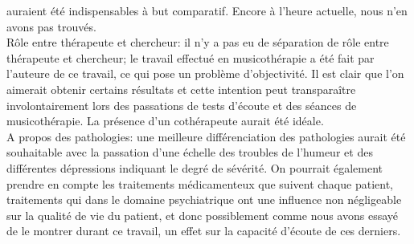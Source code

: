 auraient été indispensables à but
comparatif. Encore à l'heure actuelle, nous n'en avons pas trouvés.
\\
Rôle entre thérapeute et chercheur: il n'y a pas eu de séparation de rôle  entre thérapeute et chercheur; le 
travail effectué en musicothérapie a été fait par l'auteure de ce travail, ce qui pose un problème 
d'objectivité. Il est clair que l'on aimerait obtenir certains résultats et cette intention peut 
transparaître involontairement  lors des passations de tests d'écoute et des séances de musicothérapie. 
La présence d'un cothérapeute aurait été idéale.
\\
 A propos des pathologies: une meilleure différenciation des pathologies aurait été souhaitable avec la 
passation d'une échelle des troubles de l'humeur et des différentes
dépressions indiquant le degré de sévérité.
On pourrait également prendre en compte les 
traitements médicamenteux que suivent chaque patient, traitements qui dans le domaine psychiatrique 
ont une influence non négligeable sur la qualité de vie du patient, et donc possiblement comme nous 
avons essayé de le montrer durant ce travail, un effet sur la capacité d'écoute de ces derniers.

